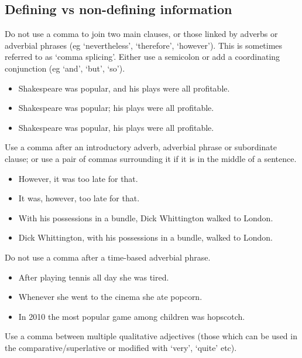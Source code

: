 \documentclass[11pt,a4paper]{book}
\newcommand{\xmark}{{\color{cadmiumred}\ding{54}}}%
\newcommand{\cmark}{{\color{green(html/cssgreen)}\checkmark}}%
\begin{document}
		\subsection{Defining vs non-defining information}
		Do not use a comma to join two main clauses, or those linked by adverbs or adverbial phrases (eg `nevertheless', `therefore', `however'). This is sometimes referred to as `comma splicing'. Either use a semicolon or add a coordinating conjunction (eg `and', `but', `so').
		{\firasans \begin{mdframed}[backgroundcolor=aliceblue] \begin{itemize}[label=\cmark]
			\item Shakespeare was popular, and his plays were all profitable.
			\item Shakespeare was popular; his plays were all profitable.
			\item[\xmark] Shakespeare was popular, his plays were all profitable.
		\end{itemize} \end{mdframed} }
		Use a comma after an introductory adverb, adverbial phrase or subordinate clause; or use a pair of commas surrounding it if it is in the middle of a sentence.
		{\firasans \begin{mdframed}[backgroundcolor=aliceblue] \begin{itemize}[label=\cmark]
			\item However, it was too late for that.
			\item It was, however, too late for that.
			\item With his possessions in a bundle, Dick Whittington walked to London.
			\item Dick Whittington, with his possessions in a bundle, walked to London.
		\end{itemize} \end{mdframed} }
		Do not use a comma after a time-based adverbial phrase.
		{\firasans \begin{mdframed}[backgroundcolor=aliceblue] \begin{itemize}[label=\cmark]
			\item After playing tennis all day she was tired.
			\item Whenever she went to the cinema she ate popcorn.
			\item In 2010 the most popular game among children was hopscotch.
		\end{itemize} \end{mdframed} }
	\newpage
		Use a comma between multiple qualitative adjectives (those which can be used in the comparative/superlative or modified with `very', `quite' etc).
\end{document}
